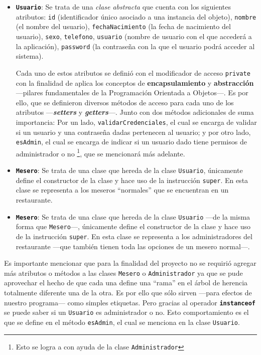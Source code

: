 \begin{itemize}
  \item \textbf{\texttt{Usuario}}: Se trata de una \textit{clase abstracta} que cuenta con los siguientes atributos: \texttt{id}
  (identificador único asociado a una instancia del objeto), \texttt{nombre} (el nombre del usuario), \texttt{fechaNacimiento} (la
  fecha de nacimiento del usuario), \texttt{sexo}, \texttt{telefono}, \texttt{usuario} (nombre de usuario con el que accederá a la aplicación),
  \texttt{password} (la contraseña con la que el usuario podrá acceder al sistema).

  Cada uno de estos atributos se definió con el modificador de acceso \texttt{private} con la finalidad de aplica los conceptos de
  \textbf{encapsulamiento} y \textbf{abstracción} ---pilares fundamentales de la Programación Orientada a Objetos---. Es por ello, que
  se definieron diversos métodos de acceso para cada uno de los atributos ---\textbf{\textit{setters}} y \textbf{\textit{getters}}---. Junto
  con dos métodos adicionales de suma importancia: Por un lado, \texttt{validarCredenciales}, el cual se encarga de validar si un usuario y
  una contraseña dadas pertenecen al usuario; y por otro lado, \texttt{esAdmin}, el cual se encarga de indicar si un usuario dado tiene permisos
  de administrador o no \footnote{Esto se logra a con ayuda de la clase \texttt{Administrador}}, que se mencionará más adelante.

  \item \textbf{\texttt{Mesero}}: Se trata de una clase que hereda de la clase \texttt{Usuario}, únicamente define el constructor de la clase
  y hace uso de la instrucción \texttt{super}. En esta clase se representa a los meseros ``normales'' que se encuentran en un restaurante.

  \item \textbf{\texttt{Mesero}}: Se trata de una clase que hereda de la clase \texttt{Usuario} ---de la misma forma que \texttt{Mesero}---, únicamente define el constructor de la clase
  y hace uso de la instrucción \texttt{super}. En esta clase se representa a los administradores del restaurante ---que también tienen toda las opciones de un mesero normal---.
\end{itemize}

Es importante mencionar que para la finalidad del proyecto no se requirió agregar más atributos o métodos a las clases \texttt{Mesero} o \texttt{Administrador}
ya que se pude aprovechar el hecho de que cada una define una ``rama'' en el árbol de herencia totalmente diferente una de la otra. Es por ello que sólo sirven ---para
efectos de nuestro programa--- como simples etiquetas. Pero gracias al operador \texttt{\textbf{instanceof}} se puede saber si un \texttt{Usuario} es administrador o no.
Esto comportamiento es el que se define en el método \texttt{esAdmin}, el cual se menciona en la clase \texttt{Usuario}.

